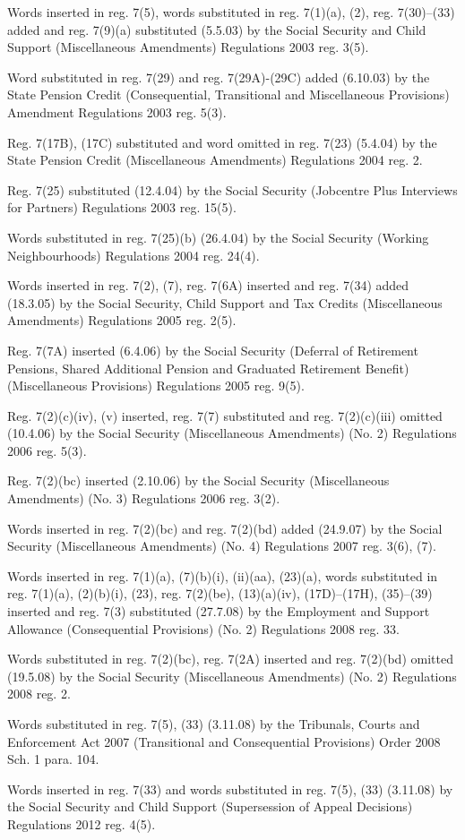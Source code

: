 \documentclass[12pt,a4paper]{article}
\begin{document}
{Words inserted in reg. 7(5), words substituted in reg. 7(1)(a), (2), reg. 7(30)--(33) added and reg. 7(9)(a) substituted (5.5.03) by the Social Security and Child Support (Miscellaneous Amendments) Regulations 2003 reg. 3(5).

Word substituted in reg. 7(29) and reg. 7(29A)-(29C) added (6.10.03) by the State Pension Credit (Consequential, Transitional and Miscellaneous Provisions) Amendment Regulations 2003 reg. 5(3).

Reg. 7(17B), (17C) substituted and word omitted in reg. 7(23) (5.4.04) by the State Pension Credit (Miscellaneous Amendments) Regulations 2004 reg. 2.

Reg. 7(25) substituted (12.4.04) by the Social Security (Jobcentre Plus Interviews for Partners) Regulations 2003 reg. 15(5).

Words substituted in reg. 7(25)(b) (26.4.04) by the Social Security (Working Neighbourhoods) Regulations 2004 reg. 24(4).

Words inserted in reg. 7(2), (7), reg. 7(6A) inserted and reg. 7(34) added (18.3.05) by the Social Security, Child Support and Tax Credits (Miscellaneous Amendments) Regulations 2005 reg. 2(5).

Reg. 7(7A) inserted (6.4.06) by the Social Security (Deferral of Retirement Pensions, Shared Additional Pension and Graduated Retirement Benefit) (Miscellaneous Provisions) Regulations 2005 reg. 9(5).

Reg. 7(2)(c)(iv), (v) inserted, reg. 7(7) substituted and reg. 7(2)(c)(iii) omitted (10.4.06) by the Social Security (Miscellaneous Amendments) (No. 2) Regulations 2006 reg. 5(3).

Reg. 7(2)(bc) inserted (2.10.06) by the Social Security (Miscellaneous Amendments) (No. 3) Regulations 2006 reg. 3(2).

Words inserted in reg. 7(2)(bc) and reg. 7(2)(bd) added (24.9.07) by the Social Security (Miscellaneous Amendments) (No. 4) Regulations 2007 reg. 3(6), (7).

\begin{sloppypar}
Words inserted in reg. 7(1)(a), (7)(b)(i), (ii)(aa), (23)(a), words substituted in reg. 7(1)(a), (2)(b)(i), (23), reg. 7(2)(be), (13)(a)(iv), (17D)--(17H), (35)--(39) inserted and reg. 7(3) substituted (27.7.08) by the Employment and Support Allowance (Consequential Provisions) (No. 2) Regulations 2008 reg. 33.
\end{sloppypar}

Words substituted in reg. 7(2)(bc), reg. 7(2A) inserted and reg. 7(2)(bd) omitted (19.5.08) by the Social Security (Miscellaneous Amendments) (No. 2) Regulations 2008 reg. 2.

Words substituted in reg. 7(5), (33) (3.11.08) by the Tribunals, Courts and Enforcement Act 2007 (Transitional and Consequential Provisions) Order 2008 Sch. 1 para. 104.

Words inserted in reg. 7(33) and words substituted in reg. 7(5), (33) (3.11.08) by the Social Security and Child Support (Supersession of Appeal Decisions) Regulations 2012 reg. 4(5).
}
\end{document}
